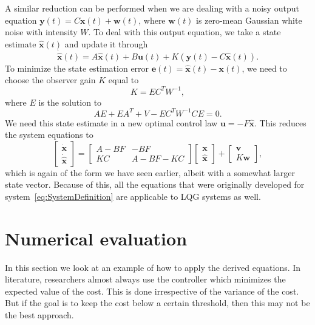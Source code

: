 \documentclass[twocolumn]{autart}
\newcommand{\ve}[1]{{\boldsymbol{#1}}} \newcommand{\tr}{\mbox{tr}} \newcommand{\ex}{\mathds{E}} \newcommand{\va}{\mathds{V}}
\begin{document}
A similar reduction can be performed when we are dealing with a noisy output equation ${\ve{y}(t) = C\ve{x}(t) + \ve{w}(t)}$, where $\ve{w}(t)$ is zero-mean Gaussian white noise with intensity $W$. To deal with this output equation, we take a state estimate $\ve{\hat{x}}(t)$ and update it through
\begin{equation}
\ve{\dot{\hat{x}}}(t) = A \ve{\hat{x}}(t) + B\ve{u}(t) + K(\ve{y}(t) - C\ve{\hat{x}}(t)).
\end{equation}
To minimize the state estimation error $\ve{e}(t) = \ve{\hat{x}}(t) - \ve{x}(t)$, we need to choose the observer gain $K$ equal to
\begin{equation}
K = E C^T W^{-1},
\end{equation}
where $E$ is the solution to
\begin{equation}
AE + EA^T + V - E C^T W^{-1} C E = 0.
\end{equation}
We need this state estimate in a new optimal control law $\ve{u} = -F\ve{\hat{x}}$. This reduces the system equations to
\begin{equation}
\begin{bmatrix}
\ve{\dot{x}} \\
\ve{\dot{\hat{x}}}
\end{bmatrix} = \begin{bmatrix}
A - BF & -BF \\
KC & A - BF - KC
\end{bmatrix} \begin{bmatrix}
\ve{x} \\
\ve{\hat{x}}
\end{bmatrix} + \begin{bmatrix}
\ve{v} \\
K\ve{w}
\end{bmatrix},
\end{equation}
which is again of the form we have seen earlier, albeit with a somewhat larger state vector. Because of this, all the equations that were originally developed for system~\eqref{eq:SystemDefinition} are applicable to LQG systems as well.

\section{Numerical evaluation} \label{s:NumericalEvaluation}

In this section we look at an example of how to apply the derived equations. In literature, researchers almost always use the controller which minimizes the expected value of the cost. This is done irrespective of the variance of the cost. But if the goal is to keep the cost below a certain threshold, then this may not be the best approach.
\end{document}
